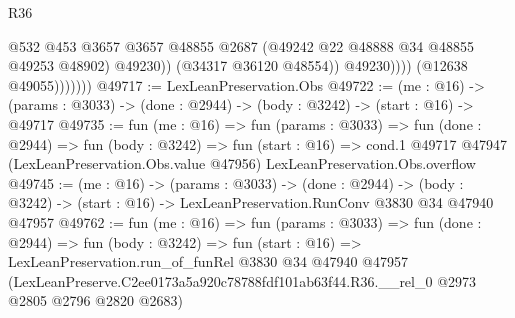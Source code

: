 \begin{lexlean}{R36}
\begin{coremodule}
                              @532
                              @453
                              @3657
                              @3657
                              @48855
                              @2687
                              (@49242 @22 @48888 @34 @48855 @49253 @48902)
                              @49230))
                          (@34317 @36120 @48554))
                        @49230))))
                (@12638 @49055)))))))
@49717 := LexLeanPreservation.Obs
@49722 := (me : @16) ->
  (params : @3033) -> (done : @2944) -> (body : @3242) -> (start : @16) -> @49717
@49735 := fun (me : @16) =>
  fun (params : @3033) =>
  fun (done : @2944) =>
  fun (body : @3242) =>
  fun (start : @16) =>
  cond.{1} @49717 @47947 (LexLeanPreservation.Obs.value @47956) LexLeanPreservation.Obs.overflow
@49745 := (me : @16) ->
  (params : @3033) ->
  (done : @2944) ->
  (body : @3242) -> (start : @16) -> LexLeanPreservation.RunConv @3830 @34 @47940 @47957
@49762 := fun (me : @16) =>
  fun (params : @3033) =>
  fun (done : @2944) =>
  fun (body : @3242) =>
  fun (start : @16) =>
  LexLeanPreservation.run_of_funRel
    @3830
    @34
    @47940
    @47957
    (LexLeanPreserve.C2ee0173a5a920c78788fdf101ab63f44.R36.__rel_0 @2973 @2805 @2796 @2820 @2683)
\end{coremodule}
\end{lexlean}
